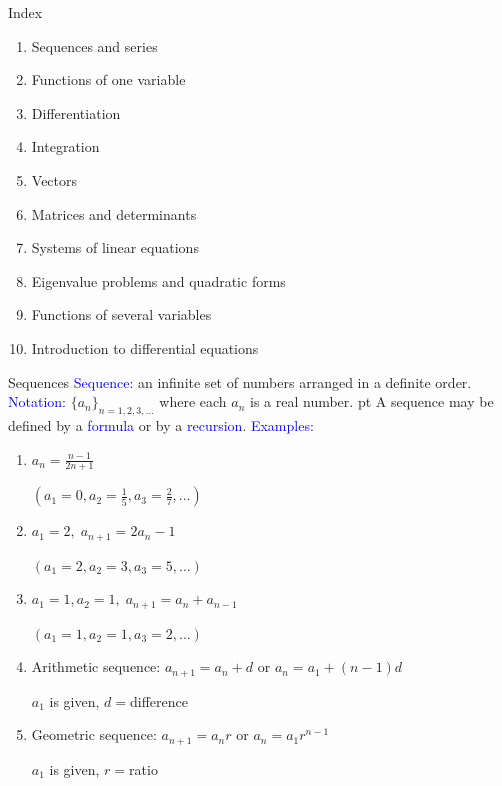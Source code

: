 \documentclass[11pt,aspectratio=169]{beamer}
\begin{document}
\begin{frame}{Index}

\begin{enumerate}
\item Sequences and series
\item Functions of one variable
\item Differentiation
\item Integration
\item Vectors
\item Matrices and determinants
\item Systems of linear equations
\item Eigenvalue problems and quadratic forms
\item Functions of several variables
\item Introduction to differential equations
\end{enumerate}\end{frame}


\begin{frame}{Sequences }
%
\textcolor{blue}{Sequence}: an infinite set of numbers arranged in a definite order. \\[3mm]

\textcolor{blue}{Notation:} $\{a_n\}_{n=1,2,3,...}$ where each $a_n$ is a real number.
 pt
A sequence may be defined by a \textcolor{blue}{formula} or by a \textcolor{blue}{recursion}.
\vskip 12pt
\textcolor{blue}{Examples:} 
\begin{enumerate}
\item $a_n=\frac{n-1}{2n+1}$\quad  \begin{tiny}$(a_1=0, a_2=\frac15,a_3=\frac27,...)$ \end{tiny}

\item $a_1=2, \; a_{n+1}=2a_n-1$\quad  \begin{tiny}$(a_1=
2, a_2=3,a_3=5,...)$ \end{tiny}



\item $a_1=1, a_2=1, \; a_{n+1}=a_n+a_{n-1}$\quad  \begin{tiny}$(a_1=1, a_2=1,a_3=2,...)$ \end{tiny}



\item \alert{Arithmetic sequence}: $a_{n+1}=a_n+d$ or $a_n=a_1+(n-1)d$

$a_1$ is given, $d=$difference 


\item \alert{Geometric sequence}: $a_{n+1}=a_n  r$ or $a_n=a_1 r^{n-1}$

$a_1$ is given, $r=$ratio
\end{enumerate}
%
\end{frame}
\end{document}

